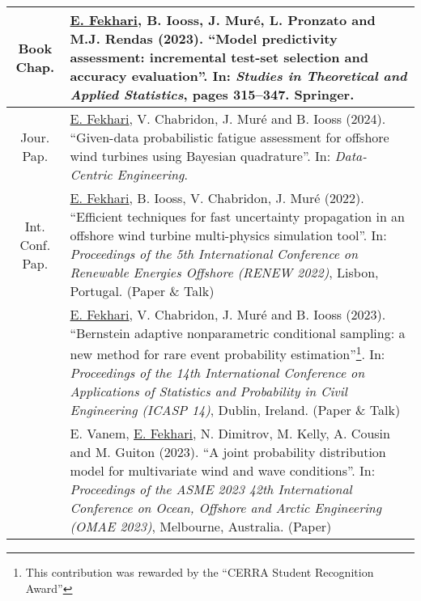 \begin{center}
    \footnotesize
    \renewcommand*{\arraystretch}{1.4}
    \begin{tabularx}{\textwidth}{c X}
        Book Chap.      & \underline{E. Fekhari}, B. Iooss, J. Muré, L. Pronzato and M.J. Rendas (2023). 
                        ``Model predictivity assessment: incremental test-set selection and accuracy evaluation''. 
                        In: \textit{Studies in Theoretical and Applied Statistics}, pages 315--347. Springer.\\
        \hline  
        Jour. Pap.      & \underline{E. Fekhari}, V. Chabridon, J. Muré and B. Iooss (2024).
                        ``Given-data probabilistic fatigue assessment for offshore wind turbines using Bayesian quadrature''. 
                        In: \textit{Data-Centric Engineering}.\\

        \hline
\shortstack{Int. Conf.\\Pap.}& \underline{E. Fekhari}, B. Iooss, V. Chabridon, J. Muré (2022). 
                    ``Efficient techniques for fast uncertainty propagation in an offshore wind turbine multi-physics simulation tool''.
                    In: \textit{Proceedings of the 5th International Conference on Renewable Energies Offshore (RENEW 2022)}, Lisbon, Portugal. (Paper \& Talk)\\
        
                    & \underline{E. Fekhari}, V. Chabridon, J. Muré and B. Iooss (2023). 
                    ``Bernstein adaptive nonparametric conditional sampling: a new method for rare event probability estimation''\footnote{This contribution was rewarded by the ``CERRA Student Recognition Award''}.
                    In: \textit{Proceedings of the 14th International Conference on Applications of Statistics and Probability in Civil Engineering (ICASP 14)}, Dublin, Ireland. (Paper \& Talk)\\
        
                    & E. Vanem, \underline{E. Fekhari}, N. Dimitrov, M. Kelly, A. Cousin and M. Guiton (2023). 
                    ``A joint probability distribution model for multivariate wind and wave conditions''.
                    In: \textit{Proceedings of the ASME 2023 42th International Conference on Ocean, Offshore and Arctic Engineering (OMAE 2023)}, Melbourne, Australia. (Paper)\\
        

\end{tabularx}
\end{center}
